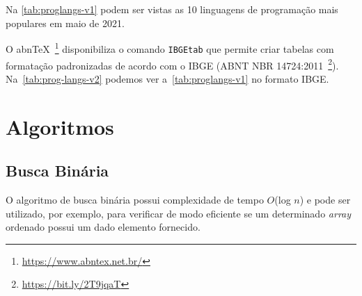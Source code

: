 \documentclass[
	12pt,    %
	oneside, %
	a4paper, %
	chapter=TITLE, %
	section=TITLE, %
	sumario=tradicional, %
	english, %
	brazil   %
] {abntex2}
\begin{document}
	Na \autoref{tab:proglangs-v1} podem ser vistas as 10 linguagens de programação mais populares em maio de 2021.	

	O abn\TeX~\footnote{\url{https://www.abntex.net.br/}} disponibiliza o comando \texttt{IBGEtab} que permite criar tabelas com formatação padronizadas de acordo com o IBGE (ABNT NBR 14724:2011~\footnote{\url{https://bit.ly/2T9jqaT}}). Na~\autoref{tab:prog-langs-v2} podemos ver a~\autoref{tab:proglangs-v1} no formato IBGE.


	\begin{table}[!htbp]
	\end{table}

	\chapter{Algoritmos}\label{sec:algoritmos}
	\section{Busca Binária}
	
	O algoritmo de \textsf{busca binária} possui complexidade de tempo $O$(log $n$) e pode ser utilizado, por exemplo, para verificar de modo eficiente se um determinado \textit{array} ordenado possui um dado elemento fornecido.
	
\end{document}
